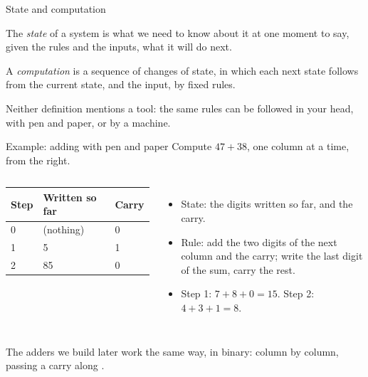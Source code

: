 \documentclass[10pt]{wosm-slides}
\begin{document}
\begin{frame}{State and computation}
  \begin{definition}[State]
    The \emph{state} of a system is what we need to know about it at one moment to
    say, given the rules and the inputs, what it will do next.
  \end{definition}

  \begin{definition}[Computation]
    A \emph{computation} is a sequence of changes of state, in which each next
    state follows from the current state, and the input, by fixed rules.
  \end{definition}

  Neither definition mentions a tool: the same rules can be followed in your head,
  with pen and paper, or by a machine.
\end{frame}

\begin{frame}{Example: adding with pen and paper}
  Compute $47 + 38$, one column at a time, from the right.

  \medskip
  \begin{columns}[T, totalwidth=\textwidth]
      \begin{tabular}{@{}lll@{}}
        \toprule
        Step & Written so far & Carry \\
        \midrule
        0 & (nothing) & 0 \\
        1 & 5 & 1 \\
        2 & 85 & 0 \\
        \bottomrule
      \end{tabular}
      \begin{itemize}
        \item State: the digits written so far, and the carry.
        \item Rule: add the two digits of the next column and the carry; write the
          last digit of the sum, carry the rest.
        \item Step 1: $7 + 8 + 0 = 15$. Step 2: $4 + 3 + 1 = 8$.
      \end{itemize}
  \end{columns}

  \bigskip
  The adders we build later work the same way, in binary: column by column,
  passing a carry along .
\end{frame}
\end{document}
